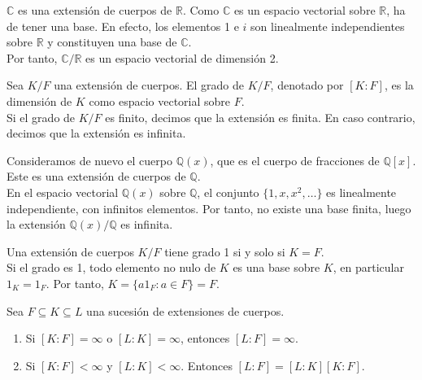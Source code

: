 \begin{example}
    $\mathbb{C}$ es una extensión de cuerpos de $\mathbb{R}$. Como $\mathbb{C}$ es un espacio vectorial sobre $\mathbb{R}$, ha de tener una base.
    En efecto, los elementos 1 e $i$ son linealmente independientes sobre $\mathbb{R}$ y constituyen una base de $\mathbb{C}$.\\
    Por tanto, $\mathbb{C}/\mathbb{R}$ es un espacio vectorial de dimensión 2.
\end{example}

\begin{definition}
    Sea $K/F$ una extensión de cuerpos. El grado de $K/F$, denotado por $[K : F]$, es la dimensión de $K$ como espacio vectorial sobre $F$.\\
    Si el grado de $K/F$ es finito, decimos que la extensión es finita. En caso contrario, decimos que la extensión es infinita.
\end{definition}

\begin{example}
    Consideramos de nuevo el cuerpo $\mathbb{Q}(x)$, que es el cuerpo de fracciones de $\mathbb{Q}[x]$. Este es una extensión de cuerpos de $\mathbb{Q}$.\\
    En el espacio vectorial $\mathbb{Q}(x)$ sobre $\mathbb{Q}$, el conjunto $\{1, x, x^2, \ldots\}$ es linealmente independiente, con infinitos elementos.
    Por tanto, no existe una base finita, luego la extensión $\mathbb{Q}(x)/\mathbb{Q}$ es infinita.
\end{example}

\begin{remark}
    Una extensión de cuerpos $K/F$ tiene grado 1 si y solo si $K = F$.\\
    Si el grado es 1, todo elemento no nulo de $K$ es una base sobre $K$, en particular $1_K = 1_F$. Por tanto, $K = \{ a1_F : a \in F \}  = F$.
\end{remark}

\begin{theorem}
    Sea $F \subseteq K \subseteq L$ una sucesión de extensiones de cuerpos.
    \begin{enumerate}
        \item Si $[K : F] = \infty$ o $[L : K] = \infty$, entonces $[L : F] = \infty$.
        \item Si $[K : F] < \infty$ y $[L : K] < \infty$. Entonces $[L : F] = [L : K] [K : F]$.
    \end{enumerate}
\end{theorem}

